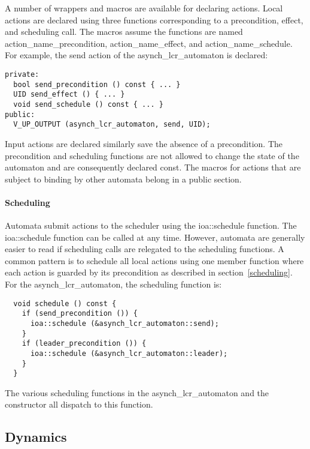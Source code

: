 A number of wrappers and macros are available for declaring actions.
Local actions are declared using three functions corresponding to a precondition, effect, and scheduling call.
The macros assume the functions are named action\_name\_precondition, action\_name\_effect, and action\_name\_schedule.
\ifjournal
For example, the send action of the asynch\_lcr\_automaton is declared:
\begin{lstlisting}
private:
  bool send_precondition () const { ... }
  UID send_effect () { ... }
  void send_schedule () const { ... }
public:
  V_UP_OUTPUT (asynch_lcr_automaton, send, UID);
\end{lstlisting}
\fi
Input actions are declared similarly save the absence of a precondition.
The precondition and scheduling functions are not allowed to change the state of the automaton and are consequently declared const.
The macros for actions that are subject to binding by other automata belong in a public section.

\paragraph*{Scheduling}
Automata submit actions to the scheduler using the ioa::schedule function.
The ioa::schedule function can be called at any time.
However, automata are generally easier to read if scheduling calls are relegated to the scheduling functions.
A common pattern is to schedule all local actions using one member function where each action is guarded by its precondition as described in section~\ref{scheduling}.
\ifjournal
For the asynch\_lcr\_automaton, the scheduling function is:
\begin{lstlisting}
  void schedule () const {
    if (send_precondition ()) {
      ioa::schedule (&asynch_lcr_automaton::send);
    }
    if (leader_precondition ()) {
      ioa::schedule (&asynch_lcr_automaton::leader);
    }
  }
\end{lstlisting}
\fi
The various scheduling functions in the asynch\_lcr\_automaton and the constructor all dispatch to this function.

\subsection{Dynamics}


